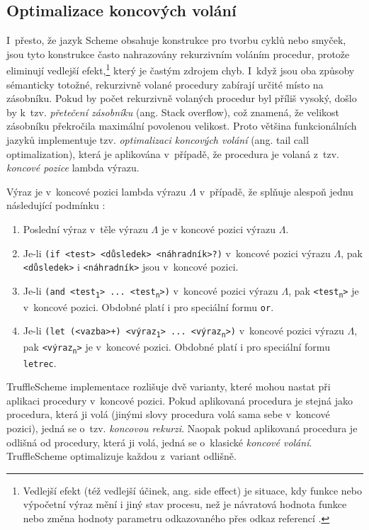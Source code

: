 \documentclass[
  master,
  biblatex,
  figures=true,
  theorems,
  sourcecodes,
  glossaries,
  index
]{kidiplom}
\begin{document}
\subsection{Optimalizace koncových volání}
I~přesto, že jazyk Scheme obsahuje konstrukce pro tvorbu cyklů nebo smyček, jsou tyto konstrukce často nahrazovány rekurzivním voláním procedur, protože eliminují vedlejší efekt,\footnote{Vedlejší efekt (též vedlejší účinek, ang. side effect) je situace, kdy funkce nebo výpočetní výraz mění i jiný stav procesu, než je návratová hodnota funkce nebo změna hodnoty parametru odkazovaného přes odkaz referencí \cite{side-effect}.} který je častým zdrojem chyb. I~když jsou oba způsoby sémanticky totožné, rekurzivně volané procedury zabírají určité místo na zásobníku. Pokud by počet rekurzivně volaných procedur byl příliš vysoký, došlo by k~tzv. \textit{přetečení zásobníku} (ang. Stack overflow), což znamená, že velikost zásobníku překročila maximální povolenou velikost. Proto většina funkcionálních jazyků implementuje tzv. \textit{optimalizaci koncových volání} (ang. tail call optimalization), která je aplikována v~případě, že procedura je volaná z~tzv. \textit{koncové pozice} lambda výrazu. 

\begin{definition}
Výraz je v~koncové pozici lambda výrazu $\Lambda$ v~případě, že splňuje alespoň jednu následující podmínku \cite{paradigmata-programovani1b}: 

\begin{enumerate}
    \item Poslední výraz v~těle výrazu $\Lambda$ je v koncové pozici výrazu $\Lambda$.
    \item Je-li \texttt{(if <test> <důsledek> <náhradník>?)} v~koncové pozici výrazu $\Lambda$, pak \texttt{<důsledek>} i \texttt{<náhradník>} jsou v~koncové pozici.
    \item Je-li \texttt{(and <test\textsubscript{1}> ... <test\textsubscript{n}>)} v~koncové pozici výrazu $\Lambda$, pak \texttt{<test\textsubscript{n}>} je v~koncové pozici. Obdobné platí i pro speciální formu \texttt{or}.
    \item Je-li \texttt{(let (<vazba>+) <výraz\textsubscript{1}> ... <výraz\textsubscript{n}>)} v~koncové pozici výrazu $\Lambda$, pak \texttt{<výraz\textsubscript{n}>} je v~koncové pozici. Obdobné platí i pro speciální formu \texttt{letrec}.
\end{enumerate}
\end{definition}


TruffleScheme implementace rozlišuje dvě varianty, které mohou nastat při aplikaci procedury v~koncové pozici. Pokud aplikovaná procedura je stejná jako procedura, která ji volá (jinými slovy procedura volá sama sebe v~koncové pozici), jedná se o~tzv. \textit{koncovou rekurzi}. Naopak pokud aplikovaná procedura je odlišná od procedury, která ji volá, jedná se o~klasické \textit{koncové volání}. TruffleScheme optimalizuje každou z~variant odlišně. 
\end{document}
